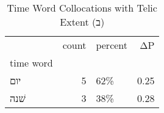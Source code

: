 \begin{table}[htbp!]
\centering
\caption{Time Word Collocations with Telic Extent (ב)}
\label{table:telicב_head_cpd}
\begin{tabular}{lrlr}
\toprule
{} &  count & percent &    ΔP \\
time word &        &         &       \\
\midrule
יום       &      5 &     62\% &  0.25 \\
שׁנה      &      3 &     38\% &  0.28 \\
\bottomrule
\end{tabular}
\end{table}
